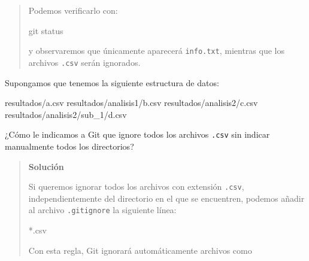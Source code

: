 \documentclass[
  spanish,
  12pt,
  letterpaper,
  DIV=11,
  numbers=noendperiod]{scrreprt}
\newenvironment{Shaded}{\begin{snugshade}}{\end{snugshade}}
\newcommand{\ExtensionTok}[1]{\textcolor[rgb]{0.00,0.23,0.31}{#1}}
\newcommand{\FunctionTok}[1]{\textcolor[rgb]{0.28,0.35,0.67}{#1}}
\newcommand{\NormalTok}[1]{\textcolor[rgb]{0.00,0.23,0.31}{#1}}
\begin{document}
\begin{tcolorbox}
\begin{quote}
Podemos verificarlo con:

\begin{Shaded}
\begin{Highlighting}[]
\FunctionTok{git}\NormalTok{ status}
\end{Highlighting}
\end{Shaded}

y observaremos que únicamente aparecerá \texttt{info.txt}, mientras que
los archivos \texttt{.csv} serán ignorados.
\end{quote}

\end{tcolorbox}

\begin{tcolorbox}[enhanced jigsaw, arc=.35mm, bottomrule=.15mm, bottomtitle=1mm, breakable, colback=white, colbacktitle=quarto-callout-note-color!10!white, colframe=quarto-callout-note-color-frame, coltitle=black, left=2mm, leftrule=.75mm, opacityback=0, opacitybacktitle=0.6, rightrule=.15mm, title=\textcolor{quarto-callout-note-color}{\faInfo}\hspace{0.5em}{Ejercicio 4}, titlerule=0mm, toprule=.15mm, toptitle=1mm]

Supongamos que tenemos la siguiente estructura de datos:

\begin{Shaded}
\begin{Highlighting}[]
\ExtensionTok{resultados/a.csv}
\ExtensionTok{resultados/analisis1/b.csv}
\ExtensionTok{resultados/analisis2/c.csv}
\ExtensionTok{resultados/analisis2/sub\_1/d.csv}
\end{Highlighting}
\end{Shaded}

¿Cómo le indicamos a Git que ignore todos los archivos \texttt{.csv} sin
indicar manualmente todos los directorios?

\begin{quote}
\textbf{Solución}

Si queremos ignorar todos los archivos con extensión \texttt{.csv},
independientemente del directorio en el que se encuentren, podemos
añadir al archivo \texttt{.gitignore} la siguiente línea:

\begin{Shaded}
\begin{Highlighting}[]
\NormalTok{*.csv}
\end{Highlighting}
\end{Shaded}

Con esta regla, Git ignorará automáticamente archivos como


\end{quote}
\end{tcolorbox}
\end{document}
